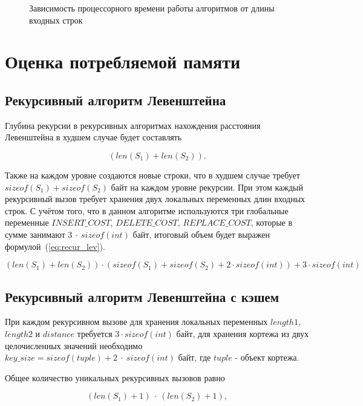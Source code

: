 \begin{figure}[!htb]
    \caption{Зависимость процессорного времени работы алгоритмов от длины входных строк}
    \label{fig:timings}
\end{figure}

\newpage

\section{Оценка потребляемой памяти}

\subsection{Рекурсивный алгоритм Левенштейна}

Глубина рекурсии в рекурсивных алгоритмах нахождения расстояния Левенштейна в худшем случае будет составлять 

\begin{equation}
    (len(S_1) + len(S_2)).
\end{equation}

Также на каждом уровне создаются новые строки, что в худшем случае требует $sizeof(S_1) + sizeof(S_2)$ байт на каждом уровне рекурсии. При этом каждый рекурсивный вызов требует хранения двух локальных переменных длин входных строк. С учётом того, что в данном алгоритме используются три глобальные переменные $INSERT\_COST$, $DELETE\_COST$, $REPLACE\_COST$, которые в сумме занимают $3~\cdot~sizeof(int)$ байт, итоговый объем будет выражен формулой~(\ref{eq:recur_lev}).

\begin{equation}
    \label{eq:recur_lev}
    (len(S_1) + len(S_2)) \cdot (sizeof(S_1) + sizeof(S_2) + 2 \cdot sizeof(int)) + 3 \cdot sizeof(int)
\end{equation}

\subsection{Рекурсивный алгоритм Левенштейна с кэшем}

При каждом рекурсивном вызове для хранения локальных переменных $length1$, $length2$ и $distance$ требуется $3 \cdot sizeof(int)$ байт, для хранения кортежа из двух целочисленных значений необходимо $key\_size = sizeof(tuple) + 2~\cdot~sizeof(int)$ байт, где $tuple$ - объект кортежа. 

Общее количество уникальных рекурсивных вызовов равно 

\begin{equation}
    \label{eq:recur_calls}
    (len(S_1) + 1)~\cdot~(len(S_2) + 1),
\end{equation}

